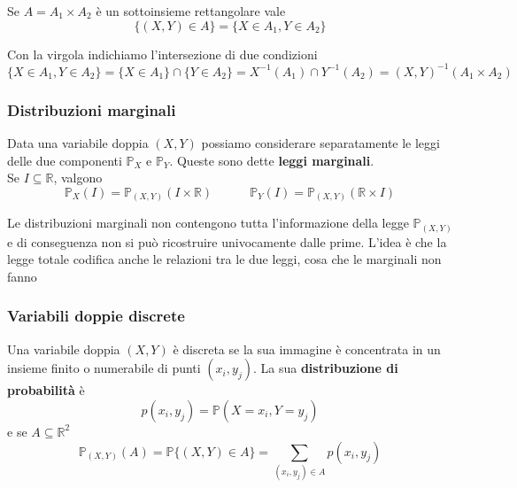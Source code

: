 \begin{observation}
	Se $A=A_1 \times A_2$ è un sottoinsieme rettangolare vale
	\begin{equation}
		\{(X,Y) \in A\} = \{X \in A_1, Y \in A_2\}
	\end{equation}
\end{observation}

\begin{note}
	Con la virgola indichiamo l'intersezione di due condizioni
	\begin{equation*}
		\{X \in A_1, Y \in A_2\} = \{X \in A_1\} \cap \{Y \in A_2\} = X^{-1}(A_1) \cap Y^{-1}(A_2) = (X,Y)^{-1}(A_1 \times A_2)
	\end{equation*}
\end{note}

\subsubsection{Distribuzioni marginali}
Data una variabile doppia $(X,Y)$ possiamo considerare separatamente le leggi delle due componenti $\mathbb{P}_X$ e $\mathbb{P}_Y$. Queste sono dette \textbf{leggi marginali}.\\
Se $I \subseteq \mathbb{R}$, valgono
\begin{equation}
	\mathbb{P}_X(I)=\mathbb{P}_{(X,Y)}(I \times \mathbb{R}) \quad\quad\quad \mathbb{P}_Y(I)=\mathbb{P}_{(X,Y)}(\mathbb{R}\times I)
\end{equation}

Le distribuzioni marginali non contengono tutta l'informazione della legge $\mathbb{P}_{(X,Y)}$ e di conseguenza non si può ricostruire univocamente dalle prime. L'idea è che la legge totale codifica anche le relazioni tra le due leggi, cosa che le marginali non fanno

\subsubsection{Variabili doppie discrete}
Una variabile doppia $(X,Y)$ è discreta se la sua immagine è concentrata in un insieme finito o numerabile di punti $(x_i, y_j)$. La sua \textbf{distribuzione di probabilità} è
\begin{equation}
	p(x_i,y_j) = \mathbb{P}(X=x_i, Y=y_j)
\end{equation}
e se $A\subseteq \mathbb{R}^2$
\begin{equation}
	\mathbb{P}_{(X,Y)}(A) = \mathbb{P}\{(X,Y) \in A\} = \sum_{(x_i, y_j) \in A}p(x_i, y_j)
\end{equation}

